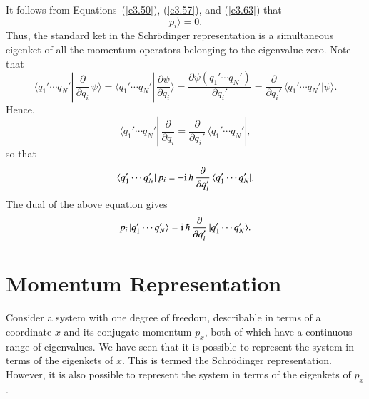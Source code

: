 It follows from Equations~(\ref{e3.50}), (\ref{e3.57}), and (\ref{e3.63}) that
\begin{equation}
p_i \rangle = 0.
\end{equation}
Thus, the standard ket in the Schr\"{o}dinger representation is a simultaneous eigenket
of all the momentum operators belonging to the eigenvalue zero. Note that
\begin{equation}
\langle q_1'\cdots q_N'|\,\frac{\partial}{\partial q_i}\, \psi\rangle = 
\langle q_1'\cdots q_N'| \,\frac{\partial \psi}{\partial q_i}\rangle 
=\frac{\partial \psi(q_1'\cdots q_N')}{\partial q_i'} = \frac{\partial }
{\partial q_i'}\,\langle q_1'\cdots q_N'|\psi\rangle.
\end{equation}
Hence,
\begin{equation}
\langle q_1'\cdots q_N'|\, \frac{\partial}{\partial q_i} = 
\frac{\partial}{\partial q_i'}\, \langle q_1'\cdots q_N'|,
\end{equation}
so that
\begin{equation}\label{e3.67}
\langle q_1'\cdots q_N'|\, p_i = -{\rm i}\,\hbar\,\frac{\partial}{\partial q_i'}\,
\langle q_1'\cdots q_N'|.
\end{equation}
The dual of the above equation gives
\begin{equation}
p_i\,|q_1'\cdots q_N'\rangle = {\rm i}\,\hbar\,\frac{\partial}{\partial q_i'}\, |q_1'\cdots
q_N'\rangle.
\end{equation}

\section{Momentum Representation}
Consider a system with one degree of freedom, describable in terms of a coordinate
$x$ and its conjugate momentum $p_x$, both of which have a continuous range of
eigenvalues. We have seen that it is possible to represent the system in terms
of the eigenkets of $x$. 
This is termed the Schr\"{o}dinger representation.
However, it is also possible to represent the system in 
terms of the eigenkets of $p_x$. 

